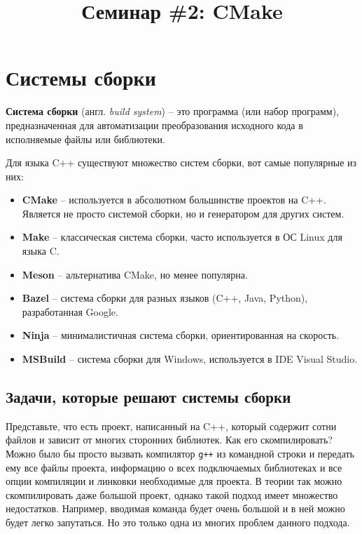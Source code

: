 \documentclass{article}
\begin{document}
\title{Семинар \#2: CMake \vspace{-5ex}}\date{}\maketitle

\section{Системы сборки}
\begin{description}
\item \textbf{Система сборки} (англ. \textit{build system}) -- это программа (или набор программ), предназначенная для автоматизации преобразования исходного кода в исполняемые файлы или библиотеки. 
\end{description}
Для языка C++ существуют множество систем сборки, вот самые популярные из них:


\begin{itemize}
\item \textbf{CMake} -- используется в абсолютном большинстве проектов на C++.\\ Является не просто системой сборки, но и генератором для других систем.
\item \textbf{Make} -- классическая система сборки, часто используется в ОС Linux для языка C.
\item \textbf{Meson} -- альтернатива CMake, но менее популярна.
\item \textbf{Bazel} -- система сборки для разных языков (C++, Java, Python), разработанная Google.
\item \textbf{Ninja} -- минималистичная система сборки, ориентированная на скорость.
\item \textbf{MSBuild} -- система сборки для Windows, используется в IDE Visual Studio.
\end{itemize}



\subsection*{Задачи, которые решают системы сборки}
Представьте, что есть проект, написанный на C++, который содержит сотни файлов и зависит от многих сторонних библиотек. Как его скомпилировать? Можно было бы просто вызвать компилятор \texttt{g++} из командной строки и передать ему все файлы проекта, информацию о всех подключаемых библиотеках и все опции компиляции и линковки необходимые для проекта. В теории так можно скомпилировать даже большой проект, однако такой подход имеет множество недостатков. Например, вводимая команда будет очень большой и в ней можно будет легко  запутаться. Но это только одна из многих проблем данного подхода. 
\end{document}

